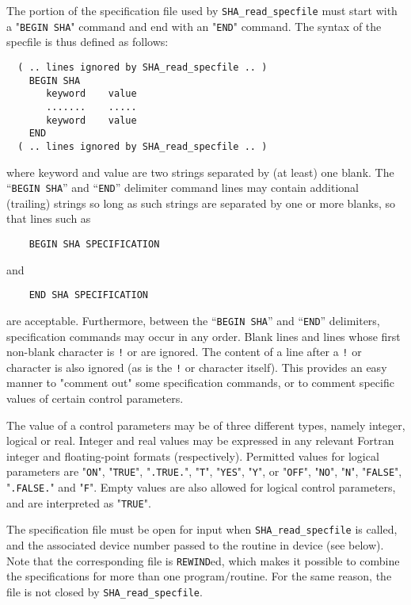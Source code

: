 \documentclass{galahad}
\newcommand{\packagename}{SHA}
\begin{document}
The portion of the specification file used by
{\tt \packagename\_read\_specfile}
must start
with a "{\tt BEGIN \packagename}" command and end with an
"{\tt END}" command.  The syntax of the specfile is thus defined as follows:
\begin{verbatim}
  ( .. lines ignored by SHA_read_specfile .. )
    BEGIN SHA
       keyword    value
       .......    .....
       keyword    value
    END
  ( .. lines ignored by SHA_read_specfile .. )
\end{verbatim}
where keyword and value are two strings separated by (at least) one blank.
The ``{\tt BEGIN \packagename}'' and ``{\tt END}'' delimiter command lines
may contain additional (trailing) strings so long as such strings are
separated by one or more blanks, so that lines such as
\begin{verbatim}
    BEGIN SHA SPECIFICATION
\end{verbatim}
and
\begin{verbatim}
    END SHA SPECIFICATION
\end{verbatim}
are acceptable. Furthermore,
between the
``{\tt BEGIN \packagename}'' and ``{\tt END}'' delimiters,
specification commands may occur in any order.  Blank lines and
lines whose first non-blank character is {\tt !} or {\tt *} are ignored.
The content
of a line after a {\tt !} or {\tt *} character is also
ignored (as is the {\tt !} or {\tt *}
character itself). This provides an easy manner to "comment out" some
specification commands, or to comment specific values
of certain control parameters.

The value of a control parameters may be of three different types, namely
integer, logical or real.
Integer and real values may be expressed in any relevant Fortran integer and
floating-point formats (respectively). Permitted values for logical
parameters are "{\tt ON}", "{\tt TRUE}", "{\tt .TRUE.}", "{\tt T}",
"{\tt YES}", "{\tt Y}", or "{\tt OFF}", "{\tt NO}",
"{\tt N}", "{\tt FALSE}", "{\tt .FALSE.}" and "{\tt F}".
Empty values are also allowed for
logical control parameters, and are interpreted as "{\tt TRUE}".

The specification file must be open for
input when {\tt \packagename\_read\_specfile}
is called, and the associated device number
passed to the routine in device (see below).
Note that the corresponding
file is {\tt REWIND}ed, which makes it possible to combine the specifications
for more than one program/routine.  For the same reason, the file is not
closed by {\tt \packagename\_read\_specfile}.
\end{document}
